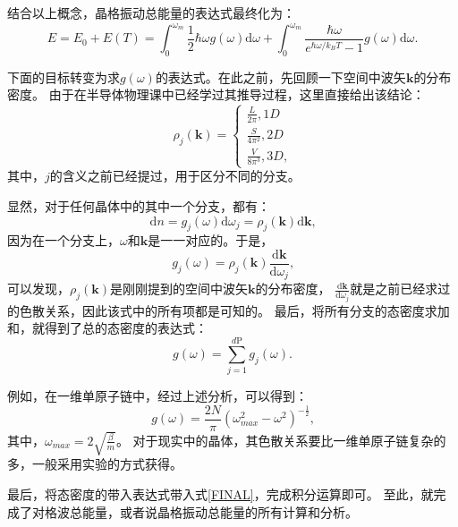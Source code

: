 \documentclass[declarePage]{ecnuthesis}
\begin{document}
结合以上概念，晶格振动总能量的表达式最终化为：
\begin{equation}
    E = E_0 + E(T) = \int_{0}^{\omega_m} \frac{1}{2}\hbar \omega g(\omega) \mathrm{d}\omega + \int_{0}^{\omega_m} \frac{\hbar \omega}{e^{\hbar \omega / k_B T}-1} g(\omega) \mathrm{d}\omega \text{.} \label{FINAL}
\end{equation}

下面的目标转变为求$g(\omega)$的表达式。在此之前，先回顾一下空间中波矢$\mathbf{k}$的分布密度。%
由于在半导体物理课中已经学过其推导过程，这里直接给出该结论：
\begin{equation}
    \rho_j(\mathbf{k}) = 
    \begin{cases}
        \frac{L}{2\pi  },1D\\
        \frac{S}{4\pi^2},2D\\
        \frac{V}{8\pi^3},3D \text{,}
    \end{cases}
\end{equation}
其中，$j$的含义之前已经提过，用于区分不同的分支。

显然，对于任何晶体中的其中一个分支，都有：
\begin{equation}
   \mathrm{d}n = g_j(\omega) \mathrm{d} \omega_j = \rho_j (\mathbf{k}) \mathrm{d} \mathbf{k} \text{,}
\end{equation}
因为在一个分支上，$\omega$和$\mathbf{k}$是一一对应的。于是，
\begin{equation}
    g_j(\omega) = \rho_j(\mathbf{k}) \frac{\mathrm{d} \mathbf{k}}{\mathrm{d} \omega_j} \text{,}
\end{equation}
可以发现，$\rho_j(\mathbf{k})$是刚刚提到的空间中波矢$\mathbf{k}$的分布密度，%
$\frac{\mathrm{d} \mathbf{k}}{\mathrm{d} \omega_j}$就是之前已经求过的色散关系，因此该式中的所有项都是可知的。
最后，将所有分支的态密度求加和，就得到了总的态密度的表达式：
\begin{equation}
    g(\omega) = \sum_{j=1}^{d \mathrm{P}}g_j(\omega) \text{.}
\end{equation}

例如，在一维单原子链中，经过上述分析，可以得到：
\begin{equation}
    g(\omega) = \frac{2N}{\pi}(\omega_{max}^2-\omega^2)^{-\frac{1}{2}} \text{,}
\end{equation}
其中，$\omega_{max}=2\sqrt{\frac{\beta}{m}}$。%
对于现实中的晶体，其色散关系要比一维单原子链复杂的多，一般采用实验的方式获得。

最后，将态密度的带入表达式带入式\ref{FINAL}，完成积分运算即可。%
至此，就完成了对格波总能量，或者说晶格振动总能量的所有计算和分析。
\end{document}
